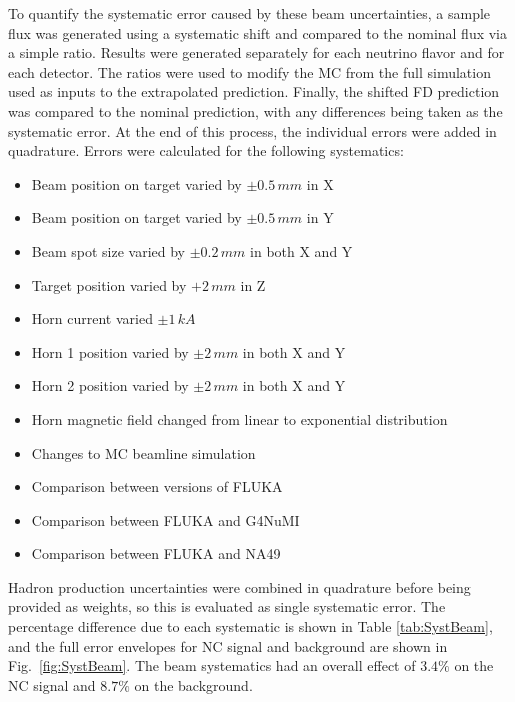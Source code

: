 To quantify the systematic error caused by these beam uncertainties, a sample flux was generated using a systematic shift and compared to the nominal flux via a simple ratio. Results were generated separately for each neutrino flavor and for each detector. The ratios were used to modify the MC from the full simulation used as inputs to the extrapolated prediction. Finally, the shifted FD prediction was compared to the nominal prediction, with any differences being taken as the systematic error. At the end of this process, the individual errors were added in quadrature. Errors were calculated for the following systematics:
\begin{itemize}
  \item Beam position on target varied by $\pm 0.5\,mm$ in X
  \item Beam position on target varied by $\pm 0.5\,mm$ in Y
  \item Beam spot size varied by $\pm 0.2\,mm$ in both X and Y
  \item Target position varied by $+ 2\, mm$ in Z
  \item Horn current varied $\pm 1\,kA$
  \item Horn 1 position varied by $\pm 2\,mm$ in both X and Y
  \item Horn 2 position varied by $\pm 2\,mm$ in both X and Y
  \item Horn magnetic field changed from linear to exponential distribution
  \item Changes to MC beamline simulation
  \item Comparison between versions of FLUKA
  \item Comparison between FLUKA and G4NuMI
  \item Comparison between FLUKA and NA49
\end{itemize}
\n Hadron production uncertainties were combined in quadrature before being provided as weights, so this is evaluated as single systematic error. The percentage difference due to each systematic is shown in Table \ref{tab:SystBeam}, and the full error envelopes for NC signal and background are shown in Fig.~\ref{fig:SystBeam}. The beam systematics had an overall effect of $3.4\%$ on the NC signal and $8.7\%$ on the background.

